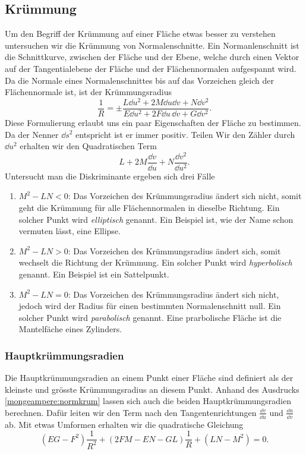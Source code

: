 \subsection{Krümmung}
Um den Begriff der Krümmung auf einer Fläche etwas besser zu verstehen
untersuchen wir die Krümmung von Normalenschnitte.
Ein Normanlenschnitt ist die Schnittkurve, zwischen der Fläche und der Ebene, welche durch einen Vektor auf 
der Tangentialebene der Fläche und der Flächennormalen aufgespannt wird.
Da die Normale eines Normalenschnittes bis auf das Vorzeichen gleich der Flächennormale ist, ist der 
Krümmungsradius
\begin{equation}
  \frac{1}{R} = \pm \frac{L \dd u^2 + 2 M \dd u \dd v + N \dd v^2}
                  {E \dd u^2 + 2F \dd u \, \dd v + G\dd v^2}.
  \label{mongeampere:normkrum}
\end{equation}
Diese Formulierung erlaubt uns ein paar Eigenschaften der Fläche zu bestimmen.
Da der Nenner $\dd s^2$ entspricht ist er immer positiv. 
Teilen Wir den Zähler durch $\dd u^2$ erhalten wir den Quadratischen Term
\begin{equation}
   L + 2M \frac{\dd v}{\dd u} + N \frac{\dd v^2}{\dd u ^2}.
  \label{mongemapere:dsik}
\end{equation}
Untersucht man die Diskriminante ergeben sich drei Fälle
\begin{enumerate}
  \item $M^2 - LN < 0$: Das Vorzeichen des Krümmungsradius ändert sich nicht, somit geht die Krümmung für alle 
    Flächennormalen in dieselbe Richtung. 
    Ein solcher Punkt wird \emph{elliptisch} genannt. Ein Beispiel ist, wie der 
    Name schon vermuten lässt, eine Ellipse.
  \item $M^2 - LN > 0$: Das Vorzeichen des Krümmungsradius ändert sich, somit wechselt die Richtung der Krümmung.
    Ein solcher Punkt wird \emph{hyperbolisch} genannt. Ein Beispiel ist ein Sattelpunkt.
  \item $M^2 - LN = 0$: Das Vorzeichen des Krümmungsradius ändert sich nicht, jedoch wird der Radius für einen 
    bestimmten Normalenschnitt null. 
    Ein solcher Punkt wird \emph{parabolisch} genannt. Eine prarbolische Fläche ist die Mantelfäche eines Zylinders. 
\end{enumerate}

\subsubsection{Hauptkrümmungsradien}
Die Hauptkrümmungsradien an einem Punkt einer Fläche sind definiert als der kleinste und grösste Krümmungsradius an diesem Punkt.
Anhand des Ausdrucks \eqref{mongeampere:normkrum} lassen sich auch die beiden Hauptkrümmungsradien berechnen.
Dafür leiten wir den Term nach den Tangentenrichtungen $\frac{\dd v}{\dd u}$ und $\frac{\dd u}{\dd v}$ ab.
Mit etwas Umformen erhalten wir die quadratische Gleichung
\begin{equation}
  (EG - F^2)\frac{1}{R^2} + (2FM - EN - GL)\frac{1}{R} + (LN-M^2) = 0.
  \label{mongeampere:mainkrum}
\end{equation}


